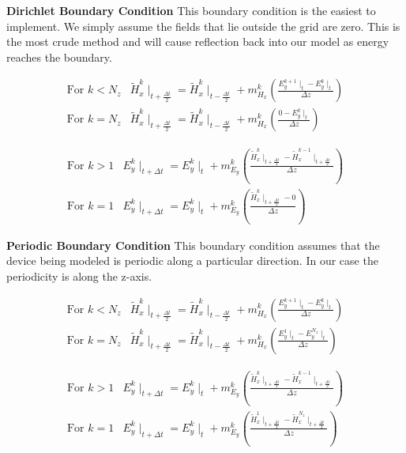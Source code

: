 \documentclass[a4paper,10pt]{article}
\begin{document}
\textbf{Dirichlet Boundary Condition}
This boundary condition is the easiest to implement.  We simply assume the fields that lie outside the grid are zero.  This is the most crude method and will cause reflection back into our model as energy reaches the boundary.


\begin{eqnarray*}
  \mbox{For } k < N_z & \tilde{H}_{x}^{k}\mid_{t+\frac{\Delta t}{2}} = \tilde{H}_{x}^{k}\mid_{t-\frac{\Delta t}{2}} + m_{H_x}^{k}\left(\frac{E_{y}^{k+1}\mid_{t} - E_{y}^{k}\mid_{t}}{\Delta z}\right) \\
  \mbox{For } k = N_z & \tilde{H}_{x}^{k}\mid_{t+\frac{\Delta t}{2}} = \tilde{H}_{x}^{k}\mid_{t-\frac{\Delta t}{2}} + m_{H_x}^{k}\left(\frac{0 - E_{y}^{k}\mid_{t}}{\Delta z}\right)
\end{eqnarray*}



\begin{eqnarray*}
  \mbox{For } k > 1 & E_{y}^{k}\mid_{t+\Delta t} = E_{y}^{k}\mid_{t} + m_{E_y}^{k}\left(\frac{\tilde{H}_{x}^{k}\mid_{t+\frac{\Delta t}{2}} - \tilde{H}_{x}^{k-1}\mid_{t+\frac  {\Delta t}{2}}}{\Delta z}\right)\\
  \mbox{For } k = 1 & E_{y}^{k}\mid_{t+\Delta t} = E_{y}^{k}\mid_{t} + m_{E_y}^{k}\left(\frac{\tilde{H}_{x}^{k}\mid_{t+\frac{\Delta t}{2}} - 0}{\Delta z}\right)
\end{eqnarray*}

\textbf{Periodic Boundary Condition}
This boundary condition assumes that the device being modeled is periodic along a particular direction.  In our case the periodicity is along the z-axis. 

\begin{eqnarray*}
  \mbox{For } k < N_z & \tilde{H}_{x}^{k}\mid_{t+\frac{\Delta t}{2}} = \tilde{H}_{x}^{k}\mid_{t-\frac{\Delta t}{2}} + m_{H_x}^{k}\left(\frac{E_{y}^{k+1}\mid_{t} - E_{y}^{k}\mid_{t}}{\Delta z}\right)\\
  \mbox{For } k = N_z & \tilde{H}_{x}^{k}\mid_{t+\frac{\Delta t}{2}} = \tilde{H}_{x}^{k}\mid_{t-\frac{\Delta t}{2}} + m_{H_x}^{k}\left(\frac{E_{y}^{1}\mid_{t} - E_{y}^{N_z}\mid_{t}}{\Delta z}\right)
\end{eqnarray*}

\begin{eqnarray*}
  \mbox{For } k > 1 & E_{y}^{k}\mid_{t+\Delta t} = E_{y}^{k}\mid_{t} + m_{E_y}^{k}\left(\frac{\tilde{H}_{x}^{k}\mid_{t+\frac{\Delta t}{2}} - \tilde{H}_{x}^{k-1}\mid_{t+\frac  {\Delta t}{2}}}{\Delta z}\right)\\
  \mbox{For } k = 1 & E_{y}^{k}\mid_{t+\Delta t} = E_{y}^{k}\mid_{t} + m_{E_y}^{k}\left(\frac{\tilde{H}_{x}^{1}\mid_{t+\frac{\Delta t}{2}} - \tilde{H}_{x}^{N_z}\mid_{t+\frac  {\Delta t}{2}}}{\Delta z}\right)
\end{eqnarray*}
\end{document}
